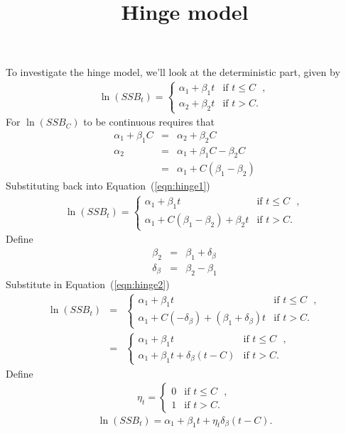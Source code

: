 \documentclass[a4paper]{article}
\title{Hinge model}
\date{}
\begin{document}
\maketitle
\noindent To investigate the hinge model, we'll look at the deterministic part, given by
\begin{eqnarray}
\ln(SSB_{t})=\begin{cases}
\alpha_1+\beta_1 t & \text{if $t \le C$ },\\
\alpha_2+\beta_2 t& \text{if $t > C$}.
\end{cases}
\label{eqn:hinge1}
\end{eqnarray}
For $\ln(SSB_{C})$ to be continuous requires that 
\begin{eqnarray}
\alpha_1+\beta_1 C &= &\alpha_2+\beta_2 C\\
\alpha_2&=&\alpha_1+\beta_1 C-\beta_2 C\\
&=&\alpha_1+ C(\beta_1-\beta_2 )
\end{eqnarray}
Substituting back into Equation~(\ref{eqn:hinge1})
\begin{eqnarray}
\ln(SSB_{t})=\begin{cases}
\alpha_1+\beta_1 t & \text{if $t \le C$ },\\
\alpha_1+ C(\beta_1-\beta_2 )+\beta_2 t &\text{if $t > C$}.
\end{cases}
\label{eqn:hinge2}
\end{eqnarray}
Define
\begin{eqnarray}
\beta_2&=&\beta_1+\delta_{\beta}\\
\delta_{\beta}&=&\beta_2-\beta_1
\end{eqnarray}
Substitute in Equation~(\ref{eqn:hinge2})
\begin{eqnarray}
\ln(SSB_{t})&=&\begin{cases}
\alpha_1+\beta_1 t & \text{if $t \le C$ },\\
\alpha_1+ C(-\delta_{\beta})+(\beta_1+\delta_{\beta}) t &\text{if $t > C$}.
\end{cases}\\
&=&\begin{cases}
\alpha_1+\beta_1 t & \text{if $t \le C$ },\\
\alpha_1 +\beta_1 t +\delta_{\beta}(t-C)&\text{if $t > C$}.
\end{cases}
\label{eqn:hinge3}
\end{eqnarray}
Define
\begin{eqnarray}
\eta_{t}=\begin{cases}
0 & \text{if $t \le C$ },\\
1 &\text{if $t > C$}.
\end{cases}
\end{eqnarray}
\begin{equation}
\ln(SSB_{t})=\alpha_1+\beta_1 t + \eta_{t}\delta_{\beta}(t-C).
\end{equation}
\end{document}

